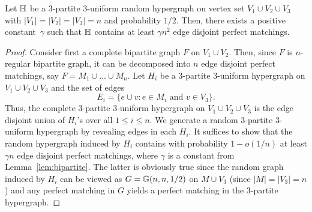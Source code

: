 \documentclass[12pt,reqno]{amsart}
\begin{document}
\begin{lemma}\label{lem:hyper_matchings}
Let $\mathbb{H}$ be a 3-partite 3-uniform random hypergraph on vertex set $V_1\cup V_2\cup V_3$ with $|V_1| = |V_2| = |V_3| = n$ and probability $1/2$. Then, there exists a positive constant~$\gamma$ such that \whp $\mathbb{H}$ contains at least $\gamma n^2$ edge disjoint perfect matchings. 
\end{lemma}
\begin{proof}
Consider first  a complete bipartite graph $F$ on $V_1\cup V_2$. Then, since $F$ is $n$-regular bipartite graph, it can be decomposed into $n$ edge disjoint perfect matchings, say $F = M_1\cup\dots\cup M_n$. Let $H_i$ be a 3-partite 3-uniform hypergraph on $V_1\cup V_2 \cup V_3$ and the set of edges
\[
E_i = \{ e \cup v : e\in M_i \text{ and } v\in V_3 \}.
\]
Thus, the complete 3-partite 3-uniform hypergraph on $V_1\cup V_2 \cup V_3$ is the edge disjoint union of $H_i$'s over all $1\le i \le n$. We generate a random 3-partite 3-uniform hypergraph by revealing edges in each $H_i$. It suffices to show that the random hypergraph induced by $H_i$ contains with probability $1-o(1/n)$ at least $\gamma n$ edge disjoint perfect matchings, where $\gamma$ is a constant from Lemma~\ref{lem:bipartite}. The latter is obviously true since the random graph induced by $H_i$ can be viewed as $G=\mathbb{G}(n,n,1/2)$ on $M \cup V_3$ (since $|M| = |V_3| = n$) and any perfect matching in $G$ yields a perfect matching in the 3-partite hypergraph.
\end{proof}
\end{document}
